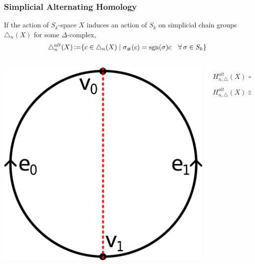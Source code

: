 \documentclass{beamer}[10pt]
\DeclareMathOperator{\sgn}{sgn}
\DeclareMathOperator{\coloneqq}{\vcentcolon=}
\theoremstyle{definition}
\begin{document}
\begin{frame}
\frametitle{Simplicial Alternating Homology}
\centering
If the action of $S_k$-space $X$ induces an action of $S_k$ on simplicial chain groups $\triangle_n(X)$ for some $\Delta$-complex,
$$\triangle_{n}^{alt}(X) \coloneqq \{ c \in \triangle_n(X) \mid \sigma_\#(c) = \sgn(\sigma)c \quad \forall \,\sigma \in S_k\}$$

\begin{columns}[T] %
\begin{column}{.4\textwidth}
\centering
\includegraphics[scale=0.15]{simplicialS1.png}
\end{column}%
\begin{column}{.58\textwidth}
\centering
\vspace{3mm}
$$H^{alt}_{n,\triangle}(X)=\begin{cases} \mathbb{Z} & n=1 \\ 0 & n\neq1\end{cases}$$
\vspace{3mm}
$$H^{alt}_{n,\triangle}(X)\cong H^{alt}_n(X)$$
\end{column}%
\end{columns}
\end{frame}
\end{document}
